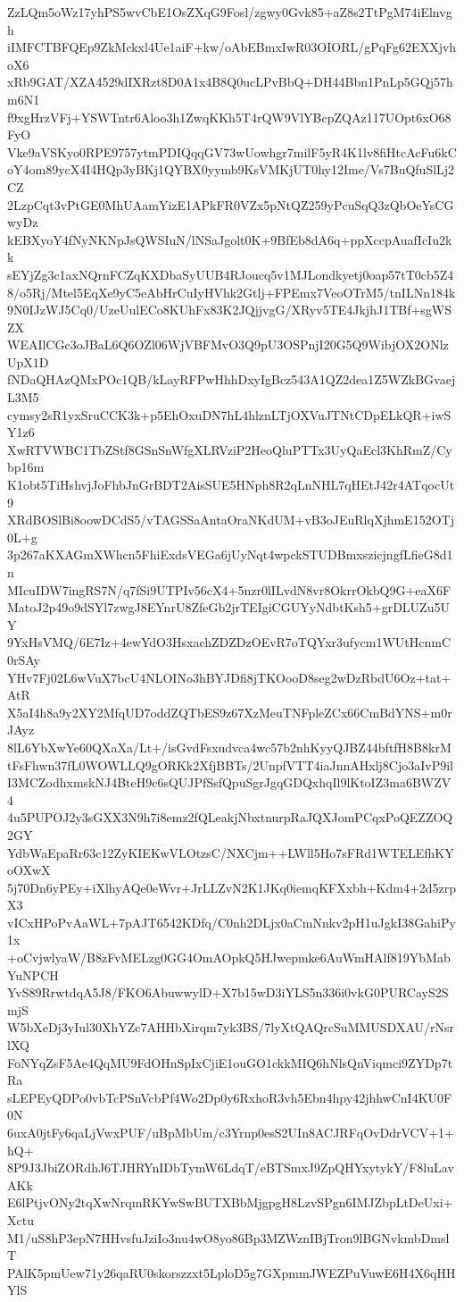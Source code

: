 ZzLQm5oWz17yhPS5wvCbE1OsZXqG9Fosl/zgwy0Gvk85+aZ8s2TtPgM74iElnvgh
iIMFCTBFQEp9ZkMckxl4Ue1aiF+kw/oAbEBmxIwR03OIORL/gPqFg62EXXjvhoX6
xRb9GAT/XZA4529dIXRzt8D0A1x4B8Q0ucLPvBbQ+DH44Bbn1PnLp5GQj57hm6N1
f9xgHrzVFj+YSWTntr6Aloo3h1ZwqKKh5T4rQW9VlYBcpZQAz117UOpt6xO68FyO
Vke9aVSKyo0RPE9757ytmPDIQqqGV73wUowhgr7milF5yR4K1lv8fiHtcAcFu6kC
oY4om89ycX4I4HQp3yBKj1QYBX0yymb9KsVMKjUT0hy12Ime/Vs7BuQfuSlLj2CZ
2LzpCqt3vPtGE0MhUAamYizE1APkFR0VZx5pNtQZ259yPcuSqQ3zQbOeYsCGwyDz
kEBXyoY4fNyNKNpJsQWSIuN/lNSaJgolt0K+9BfEb8dA6q+ppXccpAuafIcIu2kk
sEYjZg3c1axNQrnFCZqKXDbaSyUUB4RJoucq5v1MJLondkyetj0oap57tT0cb5Z4
8/o5Rj/Mtel5EqXe9yC5eAbHrCuIyHVhk2Gtlj+FPEmx7VeoOTrM5/tnILNn184k
9N0IJzWJ5Cq0/UzeUulECo8KUhFx83K2JQjjvgG/XRyv5TE4JkjhJ1TBf+sgWSZX
WEAIlCGc3oJBaL6Q6OZl06WjVBFMvO3Q9pU3OSPnjI20G5Q9WibjOX2ONlzUpX1D
fNDaQHAzQMxPOc1QB/kLayRFPwHhhDxyIgBcz543A1QZ2dea1Z5WZkBGvaejL3M5
cymsy2sR1yxSruCCK3k+p5EhOxuDN7hL4hlznLTjOXVuJTNtCDpELkQR+iwSY1z6
XwRTVWBC1TbZStf8GSnSnWfgXLRVziP2HeoQluPTTx3UyQaEcl3KhRmZ/Cybp16m
K1obt5TiHshvjJoFhbJnGrBDT2AisSUE5HNph8R2qLnNHL7qHEtJ42r4ATqocUt9
XRdBOSlBi8oowDCdS5/vTAGSSaAntaOraNKdUM+vB3oJEuRlqXjhmE152OTj0L+g
3p267aKXAGmXWhcn5FhiExdsVEGa6jUyNqt4wpckSTUDBmxszicjngfLfieG8d1n
MIcuIDW7ingRS7N/q7fSi9UTPIv56cX4+5nzr0lILvdN8vr8OkrrOkbQ9G+eaX6F
MatoJ2p49o9dSYl7zwgJ8EYnrU8ZfeGb2jrTEIgiCGUYyNdbtKsh5+grDLUZu5UY
9YxHsVMQ/6E7Iz+4ewYdO3HsxachZDZDzOEvR7oTQYxr3ufycm1WUtHcnmC0rSAy
YHv7Fj02L6wVuX7bcU4NLOINo3hBYJDfi8jTKOooD8seg2wDzRbdU6Oz+tat+AtR
X5aI4h8a9y2XY2MfqUD7oddZQTbES9z67XzMeuTNFpleZCx66CmBdYNS+m0rJAyz
8lL6YbXwYe60QXaXa/Lt+/isGvdFsxudvca4wc57b2nhKyyQJBZ44bftfH8B8krM
tFsFhwn37fL0WOWLLQ9gORKk2XfjBBTs/2UnpfVTT4iaJnnAHxlj8Cjo3aIvP9il
I3MCZodhxmskNJ4BteH9c6sQUJPfSsfQpuSgrJgqGDQxhqIl9lKtoIZ3ma6BWZV4
4u5PUPOJ2y3sGXX3N9h7i8emz2fQLeakjNbxtnurpRaJQXJomPCqxPoQEZZOQ2GY
YdbWaEpaRr63c12ZyKIEKwVLOtzsC/NXCjm++LWll5Ho7sFRd1WTELEfhKYoOXwX
5j70Dn6yPEy+iXlhyAQe0eWvr+JrLLZvN2K1JKq0iemqKFXxbh+Kdm4+2d5zrpX3
vICxHPoPvAaWL+7pAJT6542KDfq/C0nh2DLjx0aCmNnkv2pH1uJgkI38GahiPy1x
+oCvjwlyaW/B8zFvMELzg0GG4OmAOpkQ5HJwepmke6AuWmHAlf819YbMabYuNPCH
YvS89RrwtdqA5J8/FKO6AbuwwylD+X7b15wD3iYLS5n336i0vkG0PURCayS2SmjS
W5bXeDj3yIul30XhYZc7AHHbXirqm7yk3BS/7lyXtQAQrcSuMMUSDXAU/rNsrlXQ
FoNYqZsF5Ae4QqMU9FdOHnSpIxCjiE1ouGO1ckkMIQ6hNlsQnViqmci9ZYDp7tRa
sLEPEyQDPo0vbTcPSnVcbPf4Wo2Dp0y6RxhoR3vh5Ebn4hpy42jhhwCnI4KU0F0N
6uxA0jtFy6qaLjVwxPUF/uBpMbUm/c3Yrnp0esS2UIn8ACJRFqOvDdrVCV+1+hQ+
8P9J3JbiZORdhJ6TJHRYnIDbTymW6LdqT/eBTSmxJ9ZpQHYxytykY/F8luLavAKk
E6lPtjvONy2tqXwNrqmRKYwSwBUTXBbMjgpgH8LzvSPgn6IMJZbpLtDeUxi+Xctu
M1/uS8hP3epN7HHvsfuJziIo3nu4wO8yo86Bp3MZWznIBjTron9lBGNvkmbDmslT
PAlK5pmUew71y26qaRU0skorszzxt5LploD5g7GXpmmJWEZPuVuwE6H4X6qHHYlS
